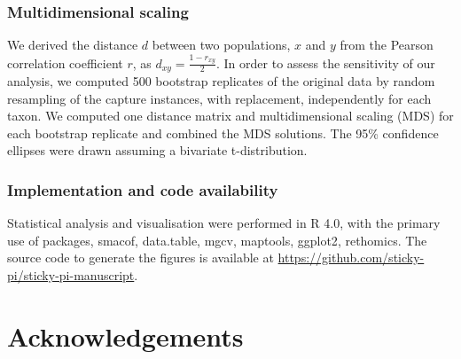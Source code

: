 \documentclass[12pt]{article}
\begin{document}
\begin{linenumbers}
		\subsubsection*{Multidimensional scaling}
		
		We derived the distance $d$ between two populations, $x$ and $y$ from the Pearson correlation coefficient $r$, as $d_{xy} = \frac{1 - r_{xy}}{2}$. In order to assess the sensitivity of our analysis, we computed 500 bootstrap replicates of the original data by random resampling of the capture instances, with replacement, independently for each taxon. We computed one distance matrix and multidimensional scaling (MDS) for each bootstrap replicate and combined the MDS solutions\cite{jacoby_bootstrap_2014}. The 95\% confidence ellipses were drawn assuming a bivariate t-distribution.
		
		\subsubsection*{Implementation and code availability}
		
		Statistical analysis and visualisation were performed in R 4.0\cite{r_core_team_r_2021}, with the primary use of packages, smacof\cite{leeuw_multidimensional_2009}, data.table\cite{dowle_datatable_2020}, mgcv\cite{wood_generalized_2017}, maptools\cite{bivand_maptools_2020}, ggplot2\cite{wickham_ggplot2_2016}, 
		rethomics\cite{geissmann_rethomics_2019}. 
		The source code to generate the figures is available at \href{https://github.com/sticky-pi/sticky-pi-manuscript}{https://github.com/sticky-pi/sticky-pi-manuscript}.
		
		
		\section*{Acknowledgements}
		{
			
}
\end{linenumbers}
\end{document}
